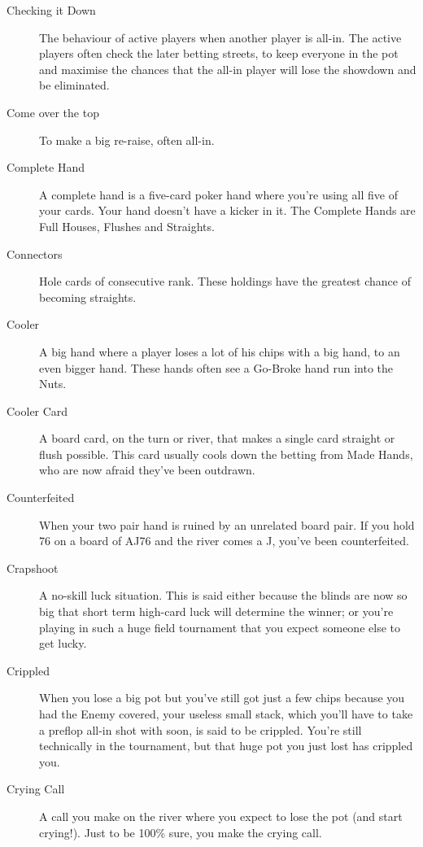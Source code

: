 \begin{description}
\item[Checking it Down] The behaviour of active players when another
player is all-in. The active players often check the later betting
streets, to keep everyone in the pot and maximise the chances that the
all-in player will lose the showdown and be eliminated.

\item[Come over the top] To make a big re-raise, often all-in.

\item[Complete Hand] A complete hand is a five-card poker hand where
you're using all five of your cards. Your hand doesn't have a kicker
in it. The Complete Hands are Full Houses, Flushes and Straights.

\item[Connectors] Hole cards of consecutive rank. These holdings have
the greatest chance of becoming straights.

\item[Cooler] A big hand where a player loses a lot of his chips with
a big hand, to an even bigger hand. These hands often see a Go-Broke
hand run into the Nuts.

\item[Cooler Card] A board card, on the turn or river, that makes a
single card straight or flush possible. This card usually cools down
the betting from Made Hands, who are now afraid they've been outdrawn.

\item[Counterfeited] When your two pair hand is ruined by an unrelated
board pair. If you hold 76 on a board of AJ76 and the river comes a J,
you've been counterfeited.

\item[Crapshoot] A no-skill luck situation. This is said either
because the blinds are now so big that short term high-card luck will
determine the winner; or you're playing in such a huge field
tournament that you expect someone else to get lucky.

\item[Crippled] When you lose a big pot but you've still got just a
few chips because you had the Enemy covered, your useless small stack,
which you'll have to take a preflop all-in shot with soon, is said to
be crippled. You're still technically in the tournament, but that huge
pot you just lost has crippled you.

\item[Crying Call] A call you make on the river where you expect to
lose the pot (and start crying!). Just to be 100\% sure, you make the
crying call.


\end{description}
